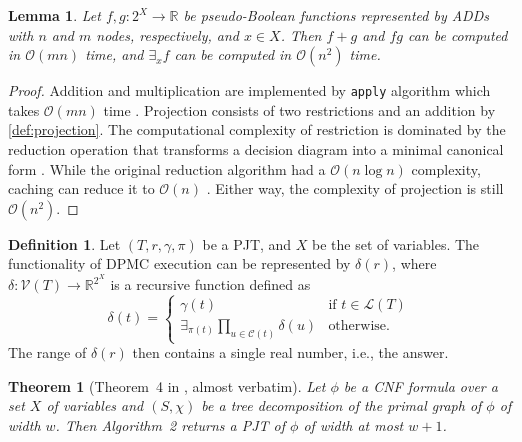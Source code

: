 \documentclass{article}
\newtheorem{theorem}{Theorem}
\newtheorem{lemma}{Lemma}
\theoremstyle{definition}
\newtheorem{definition}{Definition}
\theoremstyle{remark}
\begin{document}
\begin{lemma} \label{lemma:basic_ops}
  Let $f,g\colon 2^X \to \mathbb{R}$ be pseudo-Boolean functions represented by
  ADDs with $n$ and $m$ nodes, respectively, and $x \in X$. Then $f+g$ and $fg$
  can be computed in $\mathcal{O}(mn)$ time, and $\exists_xf$ can be computed in
  $\mathcal{O}(n^2)$ time.
\end{lemma}
\begin{proof}
  Addition and multiplication are implemented by \texttt{apply} algorithm which
  takes $\mathcal{O}(mn)$ time \cite{DBLP:journals/tc/Bryant86}. Projection
  consists of two restrictions and an addition by \cref{def:projection}. The
  computational complexity of restriction is dominated by the reduction
  operation that transforms a decision diagram into a minimal canonical form
  \cite{DBLP:journals/tc/Bryant86}. While the original reduction algorithm had a
  $\mathcal{O}(n \log n)$ complexity, caching can reduce it to $\mathcal{O}(n)$
  \cite{somenzi1998cudd}. Either way, the complexity of projection is still
  $\mathcal{O}(n^2)$.
\end{proof}

\begin{definition} \label{def:abstraction}
  Let $(T, r, \gamma, \pi)$ be a PJT, and $X$ be the set of variables. The
  functionality of \textsc{DPMC} execution can be represented by $\delta(r)$,
  where $\delta\colon \mathcal{V}(T) \to \mathbb{R}^{2^X}$ is a recursive
  function defined as
  \begin{equation} \label{eq:execution}
    \delta(t) =
    \begin{cases}
      \gamma(t) & \text{if } t \in \mathcal{L}(T) \\
      \exists_{\pi(t)} \prod_{u \in \mathcal{C}(t)} \delta(u) & \text{otherwise.}
    \end{cases}
  \end{equation}
  The range of $\delta(r)$ then contains a single real number, i.e., the answer.
\end{definition}

\begin{theorem}[Theorem~4 in \cite{DBLP:conf/cp/DudekPV20}, almost verbatim]
  Let $\phi$ be a CNF formula over a set $X$ of variables and $(S, \chi)$ be a
  tree decomposition of the primal graph of $\phi$ of width $w$. Then
  Algorithm~2 returns a PJT of $\phi$ of width at most $w+1$.
\end{theorem}
\end{document}
